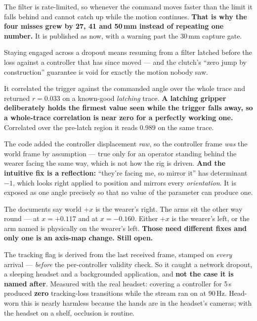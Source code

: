 {The filter is rate-limited, so whenever the command moves faster than the limit
it falls behind and cannot catch up while the motion continues.
\textbf{That is why the four misses grew by 27, 41 and 50\,mm instead of
repeating one number.} It is published as  now, with a warning past
the 30\,mm capture gate.}

{Staying engaged across a dropout means resuming from a filter latched before the
loss against a controller that has since moved --- and the clutch's ``zero jump
by construction'' guarantee is void for exactly the motion nobody saw.}

{It correlated the trigger against the commanded angle over the whole trace and
returned $r = 0.033$ on a known-good \emph{latching} trace. \textbf{A latching
gripper deliberately holds the firmest value seen while the trigger falls away,
so a whole-trace correlation is near zero for a perfectly working one.}
Correlated over the pre-latch region it reads 0.989 on the same trace.}

{The code added the controller displacement \emph{raw}, so the controller frame
\emph{was} the world frame by assumption --- true only for an operator standing
behind the wearer facing the same way, which is not how the rig is driven.
\textbf{And the intuitive fix is a reflection:} ``they're facing me, so mirror
it'' has determinant $-1$, which looks right applied to position and mirrors
every \emph{orientation}. It is exposed as one angle precisely so that no value
of the parameter can produce one.}

{The documents say world $+x$ is the wearer's right. The arms sit the other way
round ---  at $x = +0.117$ and
 at $x = -0.160$. Either $+x$ is the wearer's
left, or the arm named  is physically on the wearer's left.
\textbf{Those need different fixes and only one is an axis-map change. Still
open.}}

{The tracking flag is derived from the last received frame, stamped on
\emph{every} arrival --- \emph{before} the per-controller validity check. So it
caught a network dropout, a sleeping headset and a backgrounded application, and
\textbf{not the case it is named after}. Measured with the real headset: covering
a controller for 5\,s produced \textbf{zero} tracking-loss transitions while the
stream ran on at 90\,Hz. Head-worn this is nearly harmless because the hands are
in the headset's cameras; with the headset on a shelf, occlusion is routine.}

